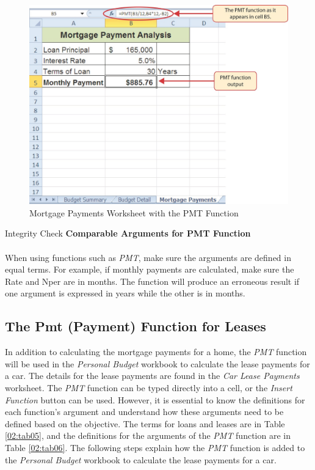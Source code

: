 \begin{figure}[H]
	\centering
	\includegraphics[width=\maxwidth{.95\linewidth}]{gfx/ch02_fig33}
	\caption{Mortgage Payments Worksheet with the PMT Function}
	\label{02:fig33}
\end{figure}

\begin{center}
	\begin{infobox}{Integrity Check}
		\textbf{Comparable Arguments for PMT Function}
		\\
		\\
		When using functions such as \textit{PMT}, make sure the arguments are defined in equal terms. For example, if monthly payments are calculated, make sure the Rate and Nper are in months. The function will produce an erroneous result if one argument is expressed in years while the other is in months.
	\end{infobox}
\end{center}

\subsection{The Pmt (Payment) Function for Leases}

In addition to calculating the mortgage payments for a home, the \textit{PMT} function will be used in the \textit{Personal Budget} workbook to calculate the lease payments for a car. The details for the lease payments are found in the \textit{Car Lease Payments} worksheet. The \textit{PMT} function can be typed directly into a cell, or the \textit{Insert Function} button can be used. However, it is essential to know the definitions for each function's argument and understand how these arguments need to be defined based on the objective. The terms for loans and leases are in Table \ref{02:tab05}, and the definitions for the arguments of the \textit{PMT} function are in Table \ref{02:tab06}. The following steps explain how the \textit{PMT} function is added to the \textit{Personal Budget} workbook to calculate the lease payments for a car.

